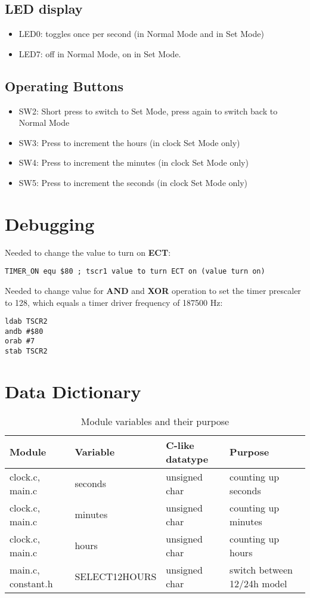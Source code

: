 \documentclass[a4paper,12pt]{article}
\begin{document}
\subsection{LED display}
\begin{itemize}
  \item LED0: toggles once per second (in Normal Mode and in Set Mode)
  \item LED7: off in Normal Mode, on in Set Mode.
\end{itemize}
\subsection{Operating Buttons}
\begin{itemize}
  \item SW2: Short press to switch to Set Mode, press again to switch back to Normal Mode
  \item SW3: Press to increment the hours (in clock Set Mode only)
  \item SW4: Press to increment the minutes (in clock Set Mode only)
  \item SW5: Press to increment the seconds (in clock Set Mode only)
\end{itemize}

\newpage
\section{Debugging}
Needed to change the value to turn on \textbf{ECT}:
\begin{lstlisting}
TIMER_ON equ $80 ; tscr1 value to turn ECT on (value turn on)
\end{lstlisting}
Needed to change value for \textbf{AND} and \textbf{XOR} operation to set the timer prescaler to 128,
which equals a timer driver frequency of 187500 Hz:
\begin{lstlisting}
ldab TSCR2
andb #$80
orab #7
stab TSCR2
\end{lstlisting}
\newpage
\section{Data Dictionary}
\begin{table}[h!]
\centering
\begin{tabular}{|l|l|l|l|}
\hline
\textbf{Module} & \textbf{Variable} & \textbf{C-like datatype} & \textbf{Purpose} \\ \hline
clock.c, main.c & seconds & unsigned char & counting up seconds \\ \hline
clock.c, main.c & minutes & unsigned char & counting up minutes \\ \hline
clock.c, main.c & hours & unsigned char & counting up hours \\ \hline
main.c, constant.h & SELECT12HOURS & unsigned char & switch between 12/24h model \\ \hline
\end{tabular}
\caption{Module variables and their purpose}
\end{table}
\newpage
\end{document}
